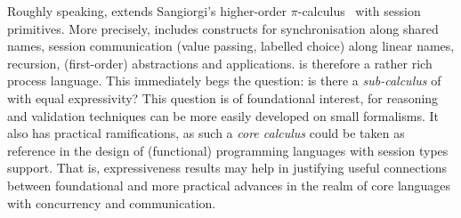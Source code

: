 
Roughly speaking, 
  \HOp %
extends Sangiorgi's higher-order $\pi$-calculus~\cite{SangiorgiD:expmpa} with session primitives.
More precisely, 
\HOp
includes
constructs for 
synchronisation along shared names, 
session communication (value passing, labelled choice) along linear names,
recursion, 
 (first-order) abstractions %
 and applications.
\HOp is therefore a rather rich process language. This immediately begs the question:
is there a \emph{sub-calculus} of \HOp with equal expressivity? %
This question is of foundational interest, 
for reasoning and validation techniques can be more easily developed on small formalisms. 
It also has practical ramifications, 
as such a \emph{core calculus} could be taken as reference in 
the design of (functional) programming languages with session types support.
That is, expressiveness results may help in justifying useful connections 
between foundational and more practical advances in the realm of core languages with concurrency and communication.



